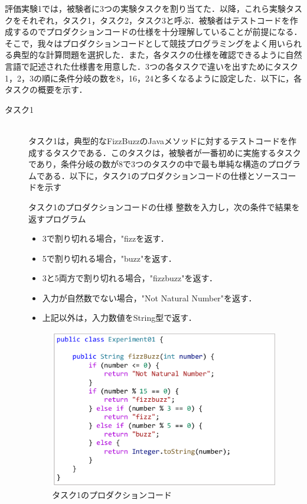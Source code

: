 \documentclass[12pt]{jarticle} %
\begin{document}
評価実験1では，被験者に3つの実験タスクを割り当てた．以降，これら実験タスクをそれぞれ，タスク1，タスク2，タスク3と呼ぶ．被験者はテストコードを作成するのでプロダクションコードの仕様を十分理解していることが前提になる．そこで，我々はプロダクションコードとして競技プログラミングをよく用いられる典型的な計算問題を選択した．また，各タスクの仕様を確認できるように自然言語で記述された仕様書を用意した．3つの各タスクで違いを出すためにタスク1，2，3の順に条件分岐の数を8，16，24と多くなるように設定した．以下に，各タスクの概要を示す．

\begin{description}
\item[タスク1]~\\
タスク1は，典型的なFizzBuzzのJavaメソッドに対するテストコードを作成するタスクである．このタスクは，被験者が一番初めに実施するタスクであり，条件分岐の数が8で3つのタスクの中で最も単純な構造のプログラムである．以下に，タスク1のプロダクションコードの仕様とソースコードを示す

\begin{itembox}[l]{タスク1のプロダクションコードの仕様}
整数を入力し，次の条件で結果を返すプログラム
\begin{itemize}
\item 3で割り切れる場合，"fizzを返す．
\item 5で割り切れる場合，"buzz"を返す．
\item 3と5両方で割り切れる場合，"fizzbuzz"を返す．
\item 入力が自然数でない場合，"Not Natural Number"を返す．
\item 上記以外は，入力数値をString型で返す．
\end{itemize}
\end{itembox}

\begin{figure}[htbp]
  \begin{center}
    \includegraphics[clip,width=10cm]{E1.pdf}
    \caption{タスク1のプロダクションコード}
    \label{E1}
  \end{center}
\end{figure}


\end{description}
\end{document}
